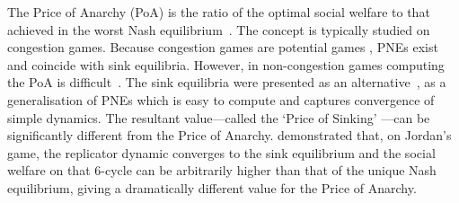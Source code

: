 \documentclass[preprint,authoryear]{elsarticle}
\begin{document}



The Price of Anarchy (PoA) is the ratio of the optimal social welfare to that achieved in the worst Nash equilibrium~\citep{koutsoupias1999worst}. The concept is typically studied on congestion games. Because congestion games are potential games \citep{monderer_potential_1996}, PNEs exist and coincide with sink equilibria. However, in non-congestion games computing the PoA is difficult~\citep{daskalakis_complexity_2009}. The sink equilibria were presented as an alternative~\citep{goemans_sink_2005,mirrokni_convergence_2004}, as a generalisation of PNEs which is easy to compute and captures convergence of simple dynamics. The resultant value---called the `Price of Sinking' \citep{goemans_sink_2005}---can be significantly different from the Price of Anarchy. \cite{kleinberg_beyond_2011} demonstrated that, on Jordan's game, the replicator dynamic converges to the sink equilibrium and the social welfare on that 6-cycle can be arbitrarily higher than that of the unique Nash equilibrium, giving a dramatically different value for the Price of Anarchy.
\end{document}
